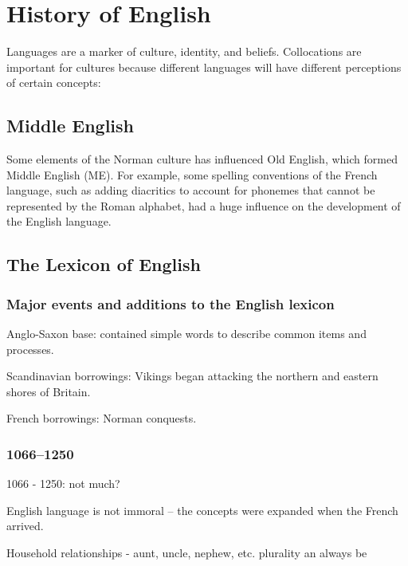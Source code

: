 \documentclass[../main.tex]{subfiles}
\begin{document}
	\section{History of English}
	Languages are a marker of culture, identity, and beliefs.
	Collocations are important for cultures because different languages will have different perceptions of certain concepts:

\subsection{Middle English}
	Some elements of the Norman culture has influenced Old English, which formed Middle English (ME). For example, some spelling conventions of the French language, such as adding diacritics to account for phonemes that cannot be represented by the Roman alphabet, had a huge influence on the development of the English language.

	\subsection{The Lexicon of English}
	\subsubsection{Major events and additions to the English lexicon}
	Anglo-Saxon base: contained simple words to describe common items and processes.  \par
	Scandinavian borrowings: Vikings began attacking the northern and eastern shores of Britain.  \par
	French borrowings: Norman conquests. \par
	\subsubsection{1066--1250}
	1066 - 1250: not much? \par
	English language is not immoral -- the concepts were expanded when the French arrived.  \par
	Household relationships - aunt, uncle, nephew, etc. plurality an always be \par
\end{document}
